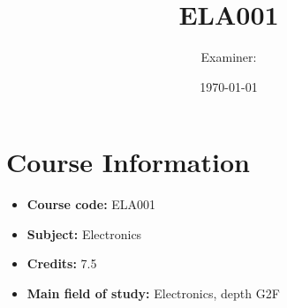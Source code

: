 \documentclass[a4paper,9pt]{article}
\title{ELA001}
\author{Examiner: }
\date{\today}
\begin{document}
\maketitle

\section*{Course Information}
\begin{itemize}[label=--]
	\item \textbf{Course code:} ELA001
	\item \textbf{Subject:} Electronics
	\item \textbf{Credits:} 7.5
	\item \textbf{Main field of study:} Electronics, depth G2F
\end{itemize}


\end{document}
